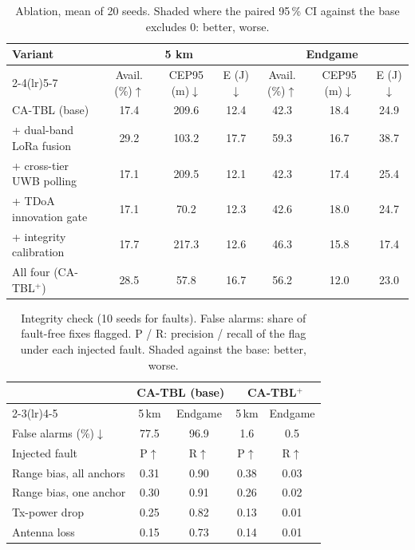 \begin{table}[t]
\centering
\small
\setlength{\tabcolsep}{4pt}
\caption{Ablation, mean of 20 seeds. Shaded where the paired 95\,\% CI against the base excludes 0: \colorbox{fav}{better}, \colorbox{unf}{worse}.}
\label{tab:ablation}
\begin{tabular}{lcccccc}
\toprule
Variant & \multicolumn{3}{c}{5 km} & \multicolumn{3}{c}{Endgame} \\
\cmidrule(lr){2-4}\cmidrule(lr){5-7}
 & Avail. (\%)$\uparrow$ & CEP95 (m)$\downarrow$ & E (J)$\downarrow$ & Avail. (\%)$\uparrow$ & CEP95 (m)$\downarrow$ & E (J)$\downarrow$ \\
\midrule
CA-TBL (base) & 17.4 & 209.6 & 12.4 & 42.3 & 18.4 & 24.9 \\
+ dual-band LoRa fusion & \cellcolor{fav}29.2 & \cellcolor{fav}103.2 & \cellcolor{unf}17.7 & \cellcolor{fav}59.3 & \cellcolor{fav}16.7 & \cellcolor{unf}38.7 \\
+ cross-tier UWB polling & 17.1 & 209.5 & 12.1 & 42.3 & 17.4 & 25.4 \\
+ TDoA innovation gate & 17.1 & \cellcolor{fav}70.2 & 12.3 & 42.6 & 18.0 & 24.7 \\
+ integrity calibration & 17.7 & 217.3 & 12.6 & \cellcolor{fav}46.3 & \cellcolor{fav}15.8 & \cellcolor{fav}17.4 \\
\midrule
All four (CA-TBL$^{+}$) & \cellcolor{fav}28.5 & \cellcolor{fav}57.8 & \cellcolor{unf}16.7 & \cellcolor{fav}56.2 & \cellcolor{fav}12.0 & 23.0 \\
\bottomrule
\end{tabular}
\end{table}

\begin{table}[t]
\centering
\small
\caption{Integrity check (10 seeds for faults). False alarms: share of fault-free fixes flagged. P / R: precision / recall of the flag under each injected fault. Shaded against the base: \colorbox{fav}{better}, \colorbox{unf}{worse}.}
\label{tab:integrity}
\begin{tabular}{lcccc}
\toprule
 & \multicolumn{2}{c}{CA-TBL (base)} & \multicolumn{2}{c}{CA-TBL$^{+}$} \\
\cmidrule(lr){2-3}\cmidrule(lr){4-5}
 & 5\,km & Endgame & 5\,km & Endgame \\
\midrule
False alarms (\%)$\downarrow$ & 77.5 & 96.9 & \cellcolor{fav}1.6 & \cellcolor{fav}0.5 \\
\midrule
Injected fault & P$\uparrow$ & R$\uparrow$ & P$\uparrow$ & R$\uparrow$ \\
\midrule
Range bias, all anchors & 0.31 & 0.90 & \cellcolor{fav}0.38 & \cellcolor{unf}0.03 \\
Range bias, one anchor & 0.30 & 0.91 & \cellcolor{unf}0.26 & \cellcolor{unf}0.02 \\
Tx-power drop & 0.25 & 0.82 & \cellcolor{unf}0.13 & \cellcolor{unf}0.01 \\
Antenna loss & 0.15 & 0.73 & \cellcolor{unf}0.14 & \cellcolor{unf}0.01 \\
\bottomrule
\end{tabular}
\end{table}

